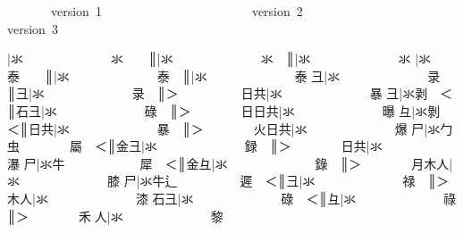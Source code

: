 \endgroup{}\begin{multicols}{2}\end{multicols}\begingroup\mktsObeyAllLines{}

\begingroup\mktsStyleCode{}       version 1                        version 2                        version 3

{\cjk{}{\cnsym{}　　　　　　}}|{\cjk{}氺{\cnsym{}　　　　　　　}氺{\cnsym{}　　}}║{\cjk{}{\cnsym{}　　　　　　　}}|{\cjk{}氺{\cnsym{}　　　　　　　}氺{\cnsym{}　}}║{\cjk{}{\cnsym{}　　　　　　　　}}|{\cjk{}氺{\cnsym{}　　　　　　　}氺} 
{\cjk{}{\cnsym{}　　　　　}}|{\cjk{}氺{\cnsym{}　　　　　　　}泰{\cnsym{}　　}}║{\cjk{}{\cnsym{}　　　　　　}}|{\cjk{}氺{\cnsym{}　　　　　　　}泰{\cnsym{}　}}║{\cjk{}{\cnsym{}　　　　　　　}}|{\cjk{}氺{\cnsym{}　　　　　　　}泰} 
{\cjk{}{\cnsym{}　　　　　}彐}|{\cjk{}氺{\cnsym{}　　　　　　　}录{\cnsym{}　　}}║{\cjk{}{\cnsym{}　　　　　　}彐}|{\cjk{}氺{\cnsym{}　　　　　　　}录{\cnsym{}　}}║{\cjk{}＞{\cnsym{}　　　　　}日共}|{\cjk{}氺{\cnsym{}　　　　　　　}暴} 
{\cjk{}{\cnsym{}　　　　　}彐}|{\cjk{}氺剥{\cnsym{}　}＜}║{\cjk{}{\cnsym{}　　　　　}石彐}|{\cjk{}氺{\cnsym{}　　　　　　　}碌{\cnsym{}　}}║{\cjk{}＞{\cnsym{}　　　　}日日共}|{\cjk{}氺{\cnsym{}　　　　　　　}曝} 
{\cjk{}{\cnsym{}　　　　　}彑}|{\cjk{}氺剝{\cnsym{}　}＜}║{\cjk{}{\cnsym{}　　　　　}日共}|{\cjk{}氺{\cnsym{}　　　　　　　}暴{\cnsym{}　}}║{\cjk{}＞{\cnsym{}　　　　}火日共}|{\cjk{}氺{\cnsym{}　　　　　　　}爆} 
{\cjk{}{\cnsym{}　　　　　}尸}|{\cjk{}氺勹虫{\cnsym{}　　　　}屬{\cnsym{}　}＜}║{\cjk{}{\cnsym{}　　　　　}金彐}|{\cjk{}氺{\cnsym{}　　　　　　　}録{\cnsym{}　}}║{\cjk{}＞{\cnsym{}　　　　}日共}|{\cjk{}氺{\cnsym{}　　　　　　　}瀑} 
{\cjk{}{\cnsym{}　　　　　}尸}|{\cjk{}氺牛{\cnsym{}　　　　　　}犀{\cnsym{}　}＜}║{\cjk{}{\cnsym{}　　　　　}金彑}|{\cjk{}氺{\cnsym{}　　　　　　　}錄{\cnsym{}　}}║{\cjk{}＞{\cnsym{}　　　　}月木人}|{\cjk{}氺{\cnsym{}　　　　　　　}膝} 
{\cjk{}{\cnsym{}　　　　　}尸}|{\cjk{}氺牛辶{\cnsym{}　　　　　}遲{\cnsym{}　}＜}║{\cjk{}{\cnsym{}　　　　　}彐}|{\cjk{}氺{\cnsym{}　　　　　　　}禄{\cnsym{}　}}║{\cjk{}＞{\cnsym{}　　　　}木人}|{\cjk{}氺{\cnsym{}　　　　　　　}漆} 
{\cjk{}{\cnsym{}　　　　}石彐}|{\cjk{}氺{\cnsym{}　　　　　　　}碌{\cnsym{}　}＜}║{\cjk{}{\cnsym{}　　　　　}彑}|{\cjk{}氺{\cnsym{}　　　　　　　}祿{\cnsym{}　}}║{\cjk{}＞{\cnsym{}　　　　}禾{\cnjzr{}}人}|{\cjk{}氺{\cnsym{}　　　　　　　}黎} 
